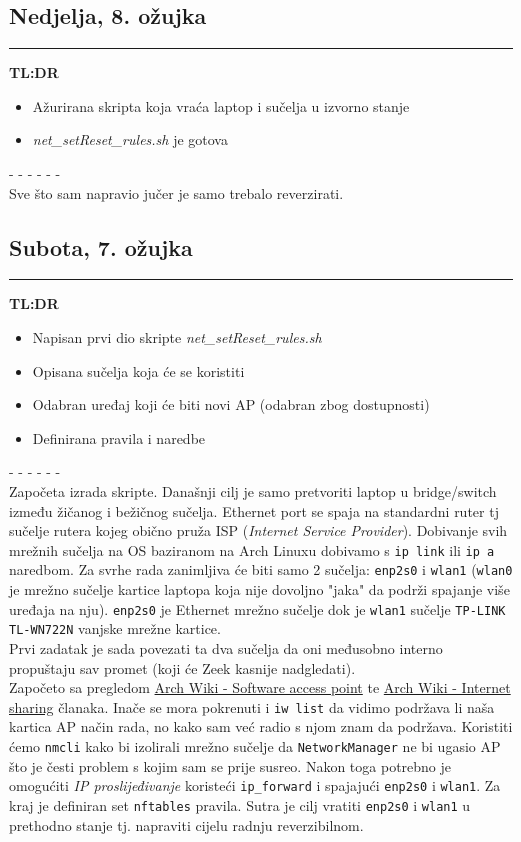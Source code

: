 \documentclass[12pt, a4paper]{article}
\newcommand{\dan}[1]{
    \subsection*{#1}
    \vspace{-0.5em} 
    \hrule \vspace{0.5em} 
}
\begin{document}
\dan{Nedjelja, 8. ožujka}
\textbf{TL:DR}
\begin{itemize}
    \item Ažurirana skripta koja vraća laptop i sučelja u izvorno stanje
    \item \textit{net\_setReset\_rules.sh} je gotova
\end{itemize}
- - - - - - \\
Sve što sam napravio jučer je samo trebalo reverzirati.

\dan{Subota, 7. ožujka}
\textbf{TL:DR}
\begin{itemize}
    \item Napisan prvi dio skripte \textit{net\_setReset\_rules.sh}
    \item Opisana sučelja koja će se koristiti
    \item Odabran uređaj koji će biti novi AP (odabran zbog dostupnosti)
    \item Definirana pravila i naredbe
\end{itemize}
- - - - - - \\
Započeta izrada skripte. Današnji cilj je samo pretvoriti laptop u bridge/switch između
žičanog i bežičnog sučelja. Ethernet port se spaja na standardni ruter tj sučelje rutera kojeg obično pruža
ISP (\textit{Internet Service Provider}). Dobivanje svih mrežnih sučelja na OS baziranom na Arch Linuxu 
dobivamo s \lstinline|ip link| ili \lstinline|ip a| naredbom. Za svrhe rada zanimljiva će biti samo 2 sučelja:
\lstinline|enp2s0| i \lstinline|wlan1| (\lstinline|wlan0| je mrežno sučelje kartice laptopa koja nije dovoljno "jaka" da podrži spajanje više uređaja na nju).
\lstinline|enp2s0| je Ethernet mrežno sučelje dok je \lstinline|wlan1| sučelje \lstinline|TP-LINK TL-WN722N| vanjske mrežne kartice.
\\
Prvi zadatak je sada povezati ta dva sučelja da oni međusobno interno propuštaju sav promet (koji će Zeek kasnije nadgledati).
\\
Započeto sa pregledom \href{https://wiki.archlinux.org/title/Software_access_point}{Arch Wiki - Software access point} te \href{https://wiki.archlinux.org/title/Internet_sharing}{Arch Wiki - Internet sharing} članaka.
Inače se mora pokrenuti i \lstinline|iw list| da vidimo podržava li naša kartica AP način rada, no kako sam već radio s njom znam da podržava.
Koristiti ćemo \lstinline|nmcli| kako bi izolirali mrežno sučelje da \lstinline|NetworkManager| ne bi ugasio AP što je česti problem s kojim sam se prije susreo.
Nakon toga potrebno je omogućiti \textit{IP proslijeđivanje} koristeći \lstinline|ip_forward| i spajajući \lstinline|enp2s0| i \lstinline|wlan1|.
Za kraj je definiran set \lstinline|nftables| pravila.
Sutra je cilj vratiti \lstinline|enp2s0| i \lstinline|wlan1| u prethodno stanje tj. napraviti cijelu radnju reverzibilnom.
\end{document}

